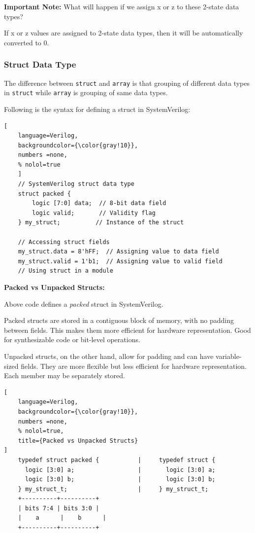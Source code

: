 \documentclass[12pt, a4paper]{article}
\begin{document}
\textbf{Important Note:} What will happen if we assign x or z to these 2-state data types?

If x or z values are assigned to 2-state data types, then it will be automatically converted to 0.

\subsubsection{Struct Data Type}
The difference between \texttt{struct} and \texttt{array}
is that grouping of different data types in \texttt{struct} while \texttt{array} is grouping of same data types.

\vspace{1em}
Following is the syntax for defining a struct in SystemVerilog:

\begin{lstlisting}[
    language=Verilog,
    backgroundcolor={\color{gray!10}},
    numbers =none,
    % nolol=true
    ]
    // SystemVerilog struct data type
    struct packed {
        logic [7:0] data;  // 8-bit data field
        logic valid;       // Validity flag
    } my_struct;          // Instance of the struct

    // Accessing struct fields
    my_struct.data = 8'hFF;  // Assigning value to data field
    my_struct.valid = 1'b1;  // Assigning value to valid field
    // Using struct in a module
\end{lstlisting}

\textbf{Packed vs Unpacked Structs:}

Above code defines a \textit{packed} struct in SystemVerilog. 

Packed structs are stored in a contiguous block of memory, with no padding between fields. This makes them more efficient for hardware representation. Good for synthesizable code or bit-level operations.

\vspace{1em}

Unpacked structs, on the other hand, allow for padding and can have variable-sized fields. They are more flexible but less efficient for hardware representation. Each member may be separately stored.

\begin{lstlisting}[
    language=Verilog,
    backgroundcolor={\color{gray!10}},
    numbers =none,
    % nolol=true,
    title={Packed vs Unpacked Structs}
]
    typedef struct packed {           |     typedef struct {
      logic [3:0] a;                  |       logic [3:0] a;
      logic [3:0] b;                  |       logic [3:0] b;
    } my_struct_t;                    |     } my_struct_t;
    +----------+----------+
    | bits 7:4 | bits 3:0 |
    |    a      |    b      |
    +----------+----------+
\end{lstlisting}
\end{document}
